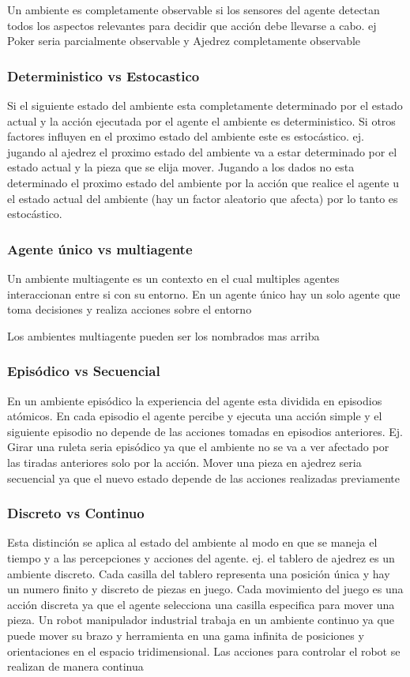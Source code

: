 Un ambiente es completamente observable si los sensores del agente detectan todos los aspectos relevantes para decidir que acción debe llevarse a cabo. ej Poker seria parcialmente observable y Ajedrez completamente observable

\subsubsection*{Deterministico vs Estocastico}

Si el siguiente estado del ambiente esta completamente determinado por el estado actual y la acción ejecutada por el agente el ambiente es deterministico. Si otros factores influyen en el proximo estado del ambiente este es estocástico. ej. jugando al ajedrez el proximo estado del ambiente va a estar determinado por el estado actual y la pieza que se elija mover. Jugando a los dados no esta determinado el proximo estado del ambiente por la acción que realice el agente u el estado actual del ambiente (hay un factor aleatorio que afecta) por lo tanto es estocástico.

\subsubsection*{Agente único vs multiagente}

Un ambiente multiagente es un contexto en el cual multiples agentes interaccionan entre si con su entorno. En un agente único hay un solo agente que toma decisiones y realiza acciones sobre el entorno 

Los ambientes multiagente pueden ser los nombrados mas arriba

\subsubsection*{Episódico vs Secuencial}
En un ambiente episódico la experiencia del agente esta dividida en episodios atómicos. En cada episodio el agente percibe y ejecuta una acción simple y el siguiente episodio no depende de las acciones tomadas en episodios anteriores. Ej. Girar una ruleta seria episódico ya que el ambiente no se va a ver afectado por las tiradas anteriores solo por la acción. Mover una pieza en ajedrez seria secuencial ya que el nuevo estado depende de las acciones realizadas previamente

\subsubsection*{Discreto vs Continuo}
Esta distinción se aplica al estado del ambiente al modo en que se maneja el tiempo y a las percepciones y acciones del agente. ej. el tablero de ajedrez es un ambiente discreto. Cada casilla del tablero representa una posición única y hay un numero finito y discreto de piezas en juego. Cada movimiento del juego es una acción discreta ya que el agente selecciona una casilla especifica para mover una pieza. Un robot manipulador industrial trabaja en un ambiente continuo ya que puede mover su brazo y herramienta en una gama infinita de posiciones y orientaciones en el espacio tridimensional. Las acciones para controlar el robot se realizan de manera continua

